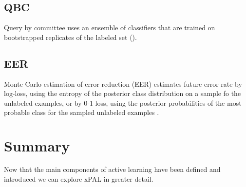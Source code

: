\subsection{QBC}
Query by committee uses an ensemble of classifiers that are trained on bootstrapped replicates of the labeled set (\cite{seung1992qbc}).

\subsection{EER}
Monte Carlo estimation of error reduction (EER) estimates future error rate by log-loss, using the entropy of the posterior class distribution on a sample fo the unlabeled examples, or by 0-1 loss, using the posterior probabilities of the most probable class for the sampled unlabeled examples \cite{roy2001eer}.

\section{Summary}
Now that the main components of active learning have been defined and introduced we can explore xPAL in greater detail.


